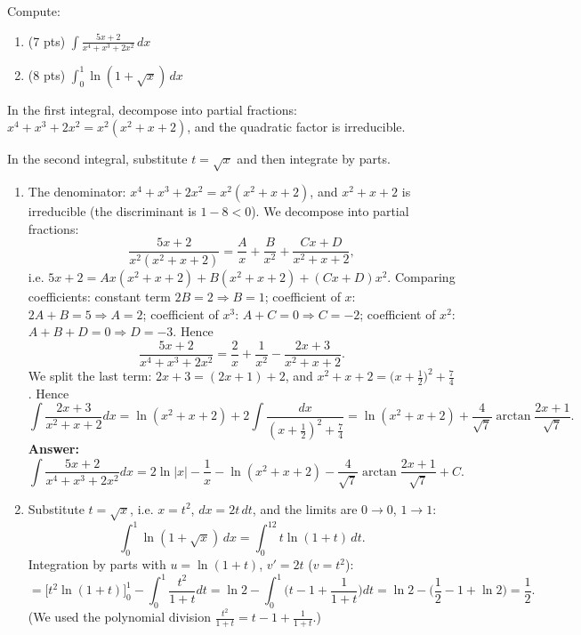 
\begin{question}
Compute:
\begin{enumerate}
  \item (7 pts) $\displaystyle\int\frac{5x+2}{x^4+x^3+2x^2}\,dx$
  \item (8 pts) $\displaystyle\int_0^1\ln(1+\sqrt{x})\,dx$
\end{enumerate}
\end{question}

\begin{hint}
In the first integral, decompose into partial fractions: $x^4+x^3+2x^2=x^2(x^2+x+2)$, and the quadratic factor is irreducible.
\end{hint}

\begin{hint}
In the second integral, substitute $t=\sqrt x$ and then integrate by parts.
\end{hint}

\begin{solution}
\begin{enumerate}
  \item The denominator: $x^4+x^3+2x^2=x^2(x^2+x+2)$, and $x^2+x+2$ is irreducible (the discriminant is $1-8<0$). We decompose into partial fractions:
  \[ \frac{5x+2}{x^2(x^2+x+2)}=\frac{A}{x}+\frac{B}{x^2}+\frac{Cx+D}{x^2+x+2}, \]
  i.e. $5x+2=Ax(x^2+x+2)+B(x^2+x+2)+(Cx+D)x^2$. Comparing coefficients: constant term $2B=2\Rightarrow B=1$; coefficient of $x$: $2A+B=5\Rightarrow A=2$; coefficient of $x^3$: $A+C=0\Rightarrow C=-2$; coefficient of $x^2$: $A+B+D=0\Rightarrow D=-3$. Hence
  \[ \frac{5x+2}{x^4+x^3+2x^2}=\frac{2}{x}+\frac{1}{x^2}-\frac{2x+3}{x^2+x+2}. \]
  We split the last term: $2x+3=(2x+1)+2$, and $x^2+x+2=\big(x+\frac12\big)^2+\frac74$. Hence
  \[ \int\frac{2x+3}{x^2+x+2}dx=\ln(x^2+x+2)+2\int\frac{dx}{(x+\frac12)^2+\frac74}=\ln(x^2+x+2)+\frac{4}{\sqrt7}\arctan\frac{2x+1}{\sqrt7}. \]
  \textbf{Answer:}
  \[ \int\frac{5x+2}{x^4+x^3+2x^2}dx=2\ln|x|-\frac1x-\ln(x^2+x+2)-\frac{4}{\sqrt7}\arctan\frac{2x+1}{\sqrt7}+C . \]
  \item Substitute $t=\sqrt x$, i.e. $x=t^2$, $dx=2t\,dt$, and the limits are $0\to0$, $1\to1$:
  \[ \int_0^1\ln(1+\sqrt x)\,dx=\int_0^12t\ln(1+t)\,dt . \]
  Integration by parts with $u=\ln(1+t)$, $v'=2t$ ($v=t^2$):
  \[ =\Big[t^2\ln(1+t)\Big]_0^1-\int_0^1\frac{t^2}{1+t}dt=\ln2-\int_0^1\Big(t-1+\frac{1}{1+t}\Big)dt=\ln2-\Big(\frac12-1+\ln2\Big)=\boxed{\frac12} . \]
  (We used the polynomial division $\frac{t^2}{1+t}=t-1+\frac{1}{1+t}$.)
\end{enumerate}
\end{solution}
